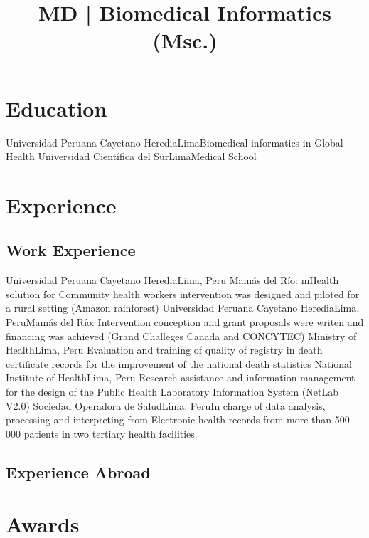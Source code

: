 \documentclass[11pt,a4paper,sans]{moderncv}
\title{MD | Biomedical Informatics (Msc.) }
\begin{document}
\makecvtitle

\section{Education}
{Universidad Peruana Cayetano Heredia}{Lima}{}{Biomedical informatics in Global Health}
{Universidad Científica del Sur}{Lima}{}{Medical School}  

\section{Experience}
\subsection{Work Experience}
{Universidad Peruana Cayetano Heredia}{Lima, Peru}{}
{Mamás del Río: mHealth solution for Community health workers intervention was designed and piloted for a rural setting (Amazon rainforest)}
{Universidad Peruana Cayetano Heredia}{Lima, Peru}{}{Mamás del Río: Intervention conception and grant proposals were writen and financing was achieved (Grand Challeges Canada and CONCYTEC)} 
{Ministry of Health}{Lima, Peru}{}
{Evaluation and training of quality of registry in death certificate records for the improvement of the national death statistics} 
{National Institute of Health}{Lima, Peru}{}
{Research assistance and information management for the design of the Public Health Laboratory Information System (NetLab V2.0)} 
{Sociedad Operadora de Salud}{Lima, Peru}{}{In charge of data analysis, processing and interpreting from Electronic health records from more than 500 000 patients in two tertiary health facilities.} 
\subsection{Experience Abroad}
\newpage

\section{Awards}
\end{document}
